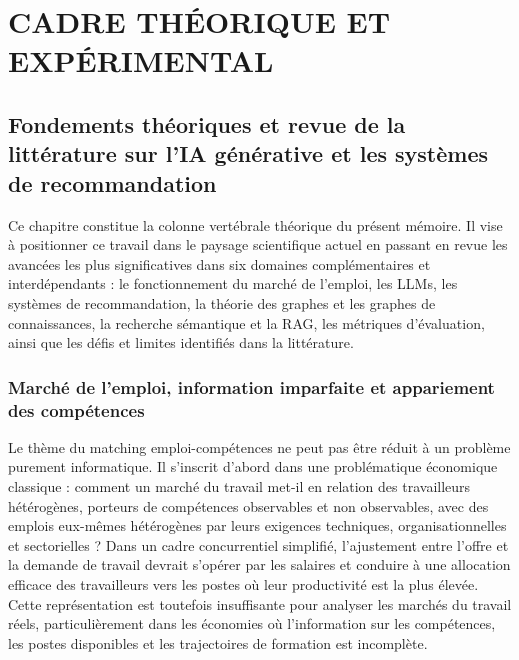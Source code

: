 \documentclass[12pt,twoside]{report}
\begin{document}
\part{CADRE THÉORIQUE ET EXPÉRIMENTAL}


\iffalse
\chapter{Fondements théoriques et revue de la littérature sur l'IA générative et les systèmes de recommandation}
\vspace{-1.4cm}
Ce chapitre constitue la colonne vertébrale théorique du présent mémoire. Il vise à positionner ce travail dans le paysage scientifique actuel en passant en revue les avancées les plus significatives dans six domaines complémentaires et interdépendants : le fonctionnement du marché de l'emploi, les LLMs, les systèmes de recommandation, la théorie des graphes et les graphes de connaissances, la recherche sémantique et la RAG, les métriques d'évaluation, ainsi que les défis et limites identifiés dans la littérature.
\section{Marché de l'emploi, information imparfaite et appariement des compétences}
Le thème du matching emploi-compétences ne peut pas être réduit à un problème purement informatique. Il s'inscrit d'abord dans une problématique économique classique : comment un marché du travail met-il en relation des travailleurs hétérogènes, porteurs de compétences observables et non observables, avec des emplois eux-mêmes hétérogènes par leurs exigences techniques, organisationnelles et sectorielles ? Dans un cadre concurrentiel simplifié, l'ajustement entre l'offre et la demande de travail devrait s'opérer par les salaires et conduire à une allocation efficace des travailleurs vers les postes où leur productivité est la plus élevée. Cette représentation est toutefois insuffisante pour analyser les marchés du travail réels, particulièrement dans les économies où l'information sur les compétences, les postes disponibles et les trajectoires de formation est incomplète.
\end{document}
